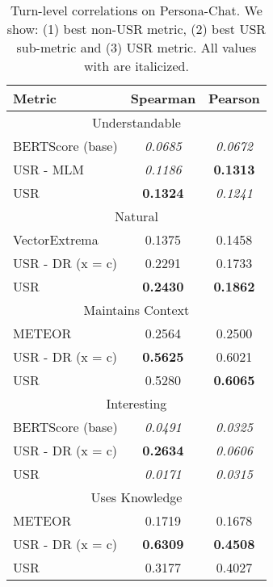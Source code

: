 \documentclass[11pt,a4paper]{article}
\begin{document}
\begin{table}
\centering
\begin{tabular}{|l|c|c|}
\hline
Metric                    & Spearman & Pearson  \\\hline
\multicolumn{3}{|c|}{Understandable} \\ \hline
BERTScore (base)          & \textit{0.0685}   & \textit{0.0672}   \\
USR - MLM               & \textit{0.1186}   & \textbf{0.1313}   \\
USR                       & \textbf{0.1324}   & \textit{0.1241}   \\
\hline
\multicolumn{3}{|c|}{Natural} \\ \hline
VectorExtrema             & 0.1375   & 0.1458   \\
USR - DR (x = c)          & 0.2291   & 0.1733  \\
USR                       & \textbf{0.2430}   & \textbf{0.1862}   \\\hline
\multicolumn{3}{|c|}{Maintains Context} \\ \hline
METEOR                    & 0.2564   & 0.2500   \\
USR - DR (x = c)   & \textbf{0.5625}  & 0.6021   \\
USR                       & 0.5280   & \textbf{0.6065}   \\\hline
\multicolumn{3}{|c|}{Interesting} \\ \hline
BERTScore (base)          & \textit{0.0491}  & \textit{0.0325}  \\
USR - DR (x = c)   & \textbf{0.2634}   &  \textit{0.0606}   \\
USR                       & \textit{0.0171}   & \textit{0.0315}   \\\hline
\multicolumn{3}{|c|}{Uses Knowledge} \\ \hline
METEOR                    & 0.1719  & 0.1678   \\
USR - DR (x = c)   & \textbf{0.6309}   &  \textbf{0.4508}   \\
USR                       & 0.3177   & 0.4027   \\\hline

\end{tabular}
\caption{Turn-level correlations on Persona-Chat. We show: (1) best non-USR metric, (2) best USR sub-metric and (3) USR metric. All values with  are italicized.}
\label{tab:all_turn_pc}
\end{table}
\end{document}
